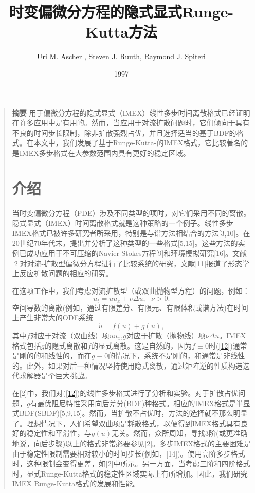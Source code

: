 \documentclass{article}
\begin{document}
\begin{CJK}{UTF8}{gkai}
\title{时变偏微分方程的隐式显式Runge-Kutta方法}
\author{Uri M. Ascher , Steven J. Ruuth, Raymond J. Spiteri}
\date{1997}
\maketitle
\begin{quotation}
\textbf{摘要}
用于偏微分方程的隐式显式（IMEX）线性多步时间离散格式已经证明在许多应用中是有用的。然而，当应用于对流扩散问题时，它们倾向于具有不良的时间步长限制，除非扩散强烈占优，并且选择适当的基于BDF的格式。在本文中，我们发展了基于Runge-Kutta-的IMEX格式，它比较著名的是IMEX多步格式在大参数范围内具有更好的稳定区域。

\section{介绍}
当时变偏微分方程（PDE）涉及不同类型的项时，对它们采用不同的离散。隐式显式（IMEX）时间离散格式就是这种策略的一个例子。线性多步IMEX格式已被许多研究者所采用，特别是与谱方法相结合的方法[3,10]。在20世纪70年代末，提出并分析了这种类型的一些格式[5,15]。这些方法的实例已成功应用于不可压缩的Navier-Stokes方程[9]和环境模拟研究[16]。文献[2]对对流-扩散型偏微分方程进行了比较系统的研究，文献[11]报道了形态学上反应扩散问题的相应的研究。

在这项工作中，我们考虑对流扩散型（或双曲抛物型方程）的问题，例如：
\begin{equation}
u_{t}=uu_{x}+\nu\Delta u,~~~\nu >0.
\label{11}
\end{equation}
空间导数的离散(例如，通过有限差分、有限元、有限体积或谱方法)在时间上产生非常大的ODE系统
\begin{equation}
\dot{u}=f(u)+g(u),
\label{12}
\end{equation}
其中$f$对应于对流（双曲线）项$uu_{x}$,$g$对应于扩散（抛物线）项$\nu\Delta u$。IMEX格式包括$g$的隐式离散和$f$的显式离散。这是自然的，因为$f\equiv 0$时(\ref{12})通常是刚的的和线性的，而在$g\equiv 0$的情况下，系统不是刚的，和通常是非线性的。此外，如果对后一种情况坚持使用隐式离散，通过矩阵逆的性质构造迭代求解器是个巨大挑战。

在[2]中，我们对(\ref{12})的线性多步格式进行了分析和实验。对于扩散占优问题，$g$有最优阻尼特性采用向后差分(BDF)种格式。相应的IMEX格式是半显式BDF(SBDF)[5,9,15]。然而，当扩散不占优时，方法的选择就不那么明显了。理想情况下，人们希望双曲项是耗散格式，以便得到IMEX格式具有良好的稳定性和平滑性，与$g(u)$无关。然而，众所周知，寻找3阶(或更准确地说，向后步骤)以上的格式非常必要参见[2]。多步IMEX格式的主要困难是由于稳定性限制需要相对较小的时间步长(例如，[14])。使用高阶多步格式时，这种限制会变得更差，如[2]中所示。另一方面，当考虑三阶和四阶格式时，显式Runge-Kutta格式的稳定性区域实际上有所增加。因此，我们研究IMEX Runge-Kutta格式的发展和性能。


\end{quotation}
\end{CJK}
\end{document}

